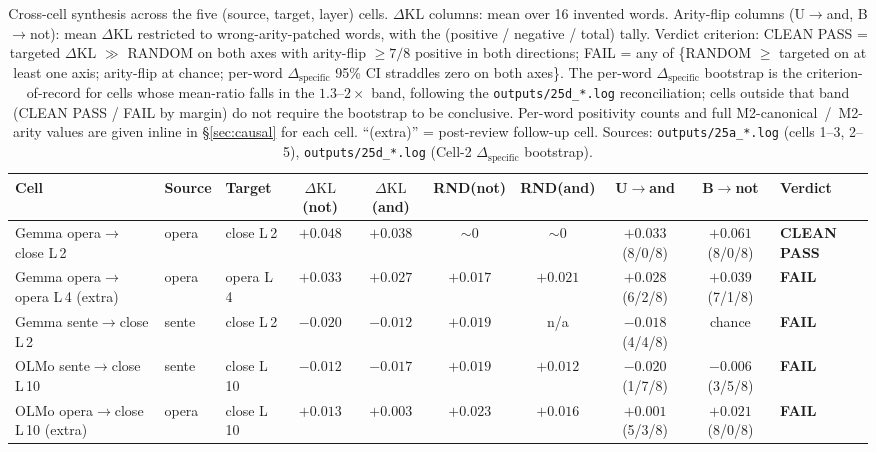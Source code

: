 \documentclass[11pt,letterpaper]{article}
\newcommand{\dkl}{\ensuremath{\Delta\mathrm{KL}}}
\newcommand{\dspec}{\ensuremath{\Delta_{\text{specific}}}}
\newcommand{\Mc}{M2-canonical}
\newcommand{\Ma}{M2-arity}
\begin{document}
\begin{table}
  \centering
  \footnotesize
  \setlength{\tabcolsep}{4pt}
  \begin{tabular}{lllccccccl}
    \toprule
    Cell & Source & Target & $\dkl$(not) & $\dkl$(and) & RND(not) & RND(and) & U$\to$and & B$\to$not & \textbf{Verdict}\\
    \midrule
    Gemma opera$\to$close L\,2         & opera & close L\,2  & $+0.048$ & $+0.038$ & ${\sim}0$ & ${\sim}0$ & $+0.033$ (8/0/8) & $+0.061$ (8/0/8) & \textbf{CLEAN PASS}\\
    Gemma opera$\to$opera L\,4 (extra) & opera & opera L\,4  & $+0.033$ & $+0.027$ & $+0.017$  & $+0.021$  & $+0.028$ (6/2/8) & $+0.039$ (7/1/8) & \textbf{FAIL}\\
    Gemma sente$\to$close L\,2         & sente & close L\,2  & $-0.020$ & $-0.012$ & $+0.019$  & n/a       & $-0.018$ (4/4/8) & chance           & \textbf{FAIL}\\
    OLMo  sente$\to$close L\,10        & sente & close L\,10 & $-0.012$ & $-0.017$ & $+0.019$  & $+0.012$  & $-0.020$ (1/7/8) & $-0.006$ (3/5/8) & \textbf{FAIL}\\
    OLMo  opera$\to$close L\,10 (extra) & opera & close L\,10 & $+0.013$ & $+0.003$ & $+0.023$  & $+0.016$  & $+0.001$ (5/3/8) & $+0.021$ (8/0/8) & \textbf{FAIL}\\
    \bottomrule
  \end{tabular}
  \caption{Cross-cell synthesis across the five (source, target,
  layer) cells. \dkl{} columns: mean over 16 invented words.
  Arity-flip columns (U$\to$and, B$\to$not): mean \dkl{} restricted
  to wrong-arity-patched words, with the (positive / negative /
  total) tally.   Verdict criterion: CLEAN PASS = targeted \dkl{}
  $\gg$ RANDOM on both axes with arity-flip $\geq 7/8$ positive in
  both directions; FAIL = any of \{RANDOM $\geq$ targeted on at least
  one axis; arity-flip at chance; per-word \dspec{} 95\% CI straddles
  zero on both axes\}. The per-word \dspec{} bootstrap is the
  criterion-of-record for cells whose mean-ratio falls in the
  $1.3$--$2\times$ band, following the
  \texttt{outputs/25d\_*.log} reconciliation; cells outside that
  band (CLEAN PASS / FAIL by margin) do not require the bootstrap
  to be conclusive. Per-word positivity counts and full
  \Mc{}~/~\Ma{} values are given inline in \S\ref{sec:causal} for
  each cell. ``(extra)'' = post-review follow-up cell. Sources:
  \texttt{outputs/25a\_*.log} (cells 1--3, 2--5),
  \texttt{outputs/25d\_*.log} (Cell-2 \dspec{} bootstrap).}
  \label{tab:causal}
\end{table}
\end{document}
